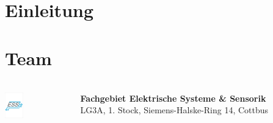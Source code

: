\section{Einleitung}

\section{Team}

\begin{frame}
    \frametitle{\insertsection}
    
    \begin{columns}
        \begin{column}[c]{0.2\textwidth}
            \includegraphics[height=3em]{fig/logo_ess}  
        \end{column}
        \begin{column}[c]{0.7\textwidth}
            \textbf{Fachgebiet Elektrische Systeme \& Sensorik}\\
            LG3A, 1. Stock, Siemens-Halske-Ring 14, Cottbus
        \end{column}
    \end{columns}
    
    \vfill


\end{frame}

